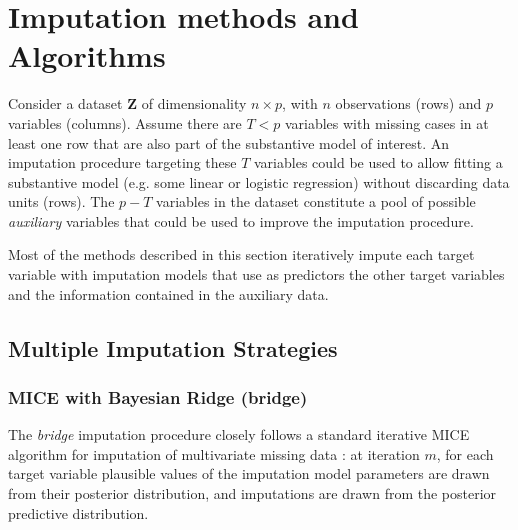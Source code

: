 \maketitle
\section{Imputation methods and Algorithms}


Consider a dataset $\bm{Z}$ of dimensionality $n \times p$, with $n$ observations (rows) and 
$p$ variables (columns). 
Assume there are $T < p$ variables with missing cases in at least one row that are also part of the substantive
model of interest. 
An imputation procedure targeting these $T$ variables could be used to allow fitting a substantive 
model (e.g. some linear or logistic regression) without discarding data units (rows).
The $p - T$ variables in the dataset constitute a pool of possible \emph{auxiliary} variables that
could be used to improve the imputation procedure.

Most of the methods described in this section iteratively impute each target variable with imputation models
that use as predictors the other target variables and the information contained in the auxiliary data. 

\subsection{Multiple Imputation Strategies}

\subsubsection{MICE with Bayesian Ridge (bridge)}
	The \emph{bridge} imputation procedure closely follows a standard iterative MICE algorithm for imputation of 
	multivariate missing data \citep[p. 120, algorithm 4.3]{vanBuuren:2012}: at iteration $m$, for each target 
	variable plausible values of the imputation model parameters are drawn from their posterior distribution, 
	and imputations are drawn from the posterior predictive distribution. 


